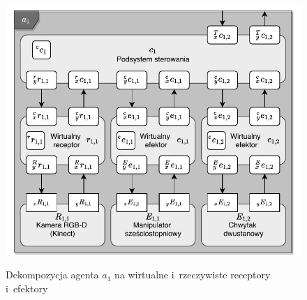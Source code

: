 \begin{figure}
    \centering
    \includegraphics[width=\columnwidth]{figures/ISR-agent-decomposition.pdf}
    \label{fig:dekompozycja-agent-1}
    \caption{Dekompozycja agenta $a_{1}$ na wirtualne i~rzeczywiste receptory i~efektory}
\end{figure}

